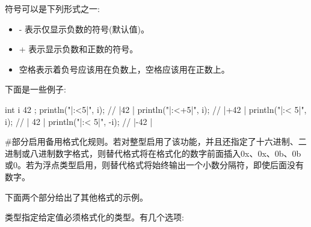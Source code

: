 符号可以是下列形式之一:

\begin{itemize}
\item
- 表示仅显示负数的符号(默认值)。

\item
+ 表示显示负数和正数的符号。

\item
空格表示着负号应该用在负数上，空格应该用在正数上。
\end{itemize}

下面是一些例子:

\begin{cpp}
int i { 42 };
println("|{:<5}|", i);   // |42  |
println("|{:<+5}|", i);  // |+42 |
println("|{:< 5}|", i);  // | 42 |
println("|{:< 5}|", -i); // |-42 |
\end{cpp}

\mySamllsection{\#}

\#部分启用备用格式化规则。若对整型启用了该功能，并且还指定了十六进制、二进制或八进制数字格式，则替代格式将在格式化的数字前面插入0x、0x、0b、0b或0。若为浮点类型启用，则替代格式将始终输出一个小数分隔符，即使后面没有数字。

下面两个部分给出了其他格式的示例。


类型指定给定值必须格式化的类型。有几个选项:

